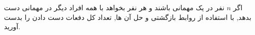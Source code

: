 \exercise
اگر
$n$
نفر در یک مهمانی باشند و هر نفر بخواهد با همه افراد دیگر در مهمانی دست بدهد, با استفاده از روابط بازگشتی و حل آن ها, تعداد کل دفعات دست دادن را بدست آورید.